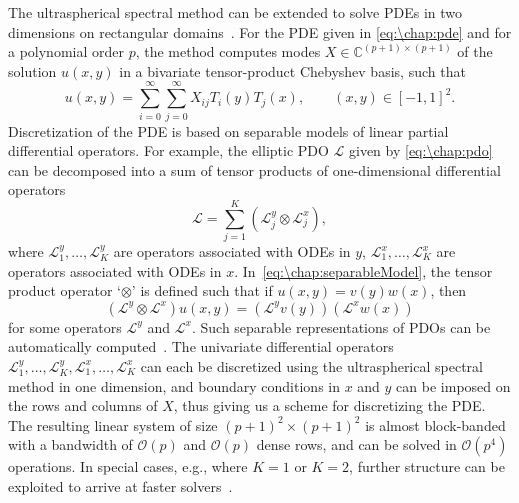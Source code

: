 The ultraspherical spectral method can be extended to solve PDEs in two dimensions on rectangular domains~\cite{Townsend_15_01}. For the PDE given in \cref{eq:\chap:pde} and for a polynomial order $p$, the method computes modes $X \in \mathbb{C}^{(p+1) \times (p+1)}$ of the solution $u(x,y)$ in a bivariate tensor-product Chebyshev basis, such that
\[
u(x,y) = \sum_{i=0}^\infty \sum_{j=0}^\infty X_{ij} T_i(y) T_j(x), \qquad (x,y) \in [-1,1]^2.
\]
Discretization of the PDE is based on separable models of linear partial differential operators. For example, the elliptic PDO $\mathcal{L}$ given by \cref{eq:\chap:pdo} can be decomposed into a sum of tensor products of one-dimensional differential operators
\begin{equation}
\mathcal{L} = \sum_{j=1}^K \left(\mathcal{L}_j^y\otimes \mathcal{L}_j^x\right),
\label{eq:\chap:separableModel}
\end{equation}
where $\mathcal{L}^y_1,\ldots, \mathcal{L}^y_K$ are operators associated with ODEs in $y$, $\mathcal{L}_1^x,\ldots, \mathcal{L}_K^x$ are operators associated with ODEs in $x$. In~\cref{eq:\chap:separableModel}, the tensor product operator `$\otimes$' is defined such that if $u(x,y) = v(y) w(x)$, then
\[
\left(\mathcal{L}^y \otimes \mathcal{L}^x\right) u(x,y) = \left(\mathcal{L}^y v(y)\right) \left(\mathcal{L}^x w(x)\right)
\]
for some operators $\mathcal{L}^y$ and $\mathcal{L}^x$.
Such separable representations of PDOs can be automatically computed~\cite{Townsend_15_01}. The univariate differential operators $\mathcal{L}^y_1,\ldots, \mathcal{L}^y_K, \mathcal{L}_1^x,\ldots, \mathcal{L}_K^x$ can each be discretized using the ultraspherical spectral method in one dimension, and boundary conditions in $x$ and $y$ can be imposed on the rows and columns of $X$, thus giving us a scheme for discretizing the PDE. The resulting linear system of size $(p+1)^2 \times (p+1)^2$ is almost block-banded with a bandwidth of $\mathcal{O}(p)$ and $\mathcal{O}(p)$ dense rows, and can be solved in $\mathcal{O}(p^4)$ operations. In special cases, e.g., where $K=1$ or $K=2$, further structure can be exploited to arrive at faster solvers~\cite{Townsend_15_01,Fortunato_19_01}.

